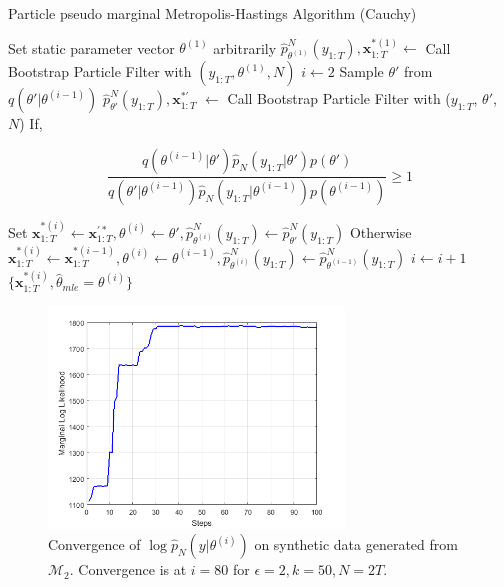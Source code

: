 \documentclass[11pt,a4,twosided,singlespacing,titlepagenumber=on]{scrreprt}
\numberwithin{equation}{chapter} %
\theoremstyle{remark}
\newcommand{\matr}[1]{\mathbf{#1}}
\begin{document}
\begin{algorithm}[H]
\caption{Particle pseudo marginal Metropolis-Hastings Algorithm (Cauchy)}\label{algo_pmcmc_cauchy}
\begin{algorithmic}[1]
\State Set static parameter vector $\theta^{(1)}$ arbitrarily
\State $\hat{p}^N_{\theta^{(1)}}(y_{1:T}), \matr{x}^{*(1)}_{1:T} \gets$ Call Bootstrap Particle Filter with $(y_{1:T}, \theta^{(1)}, N)$
\State $i \gets 2$
	\State Sample $\theta'$ from $q(\theta'|\theta^{(i-1)})$
	\State $\hat{p}^N_{\theta'}(y_{1:T}), \matr{x}^{*'}_{1:T}$ $ \gets$ Call Bootstrap Particle Filter with ($y_{1:T}$, $\theta'$, $N$)
	\State If,
	
	$$\frac{q(\theta^{(i-1)}|\theta')\hat{p}_N(y_{1:T}|\theta')p(\theta')}{q(\theta'|\theta^{(i-1)})\hat{p}_N(y_{1:T}|\theta^{(i-1)})p(\theta^{(i-1)})} \geq 1$$
	
	\State Set $\matr{x}^{*(i)}_{1:T} \gets \matr{x}^{'*}_{1:T},\theta^{(i)} \gets \theta', \hat{p}^N_{\theta^{(i)}}(y_{1:T}) \gets \hat{p}^N_{\theta'}(y_{1:T})$
	\State Otherwise $\matr{x}^{*(i)}_{1:T} \gets \matr{x}^{*(i-1)}_{1:T},\theta^{(i)} \gets \theta^{(i-1)}, \hat{p}^N_{\theta^{(i)}}(y_{1:T}) \gets \hat{p}^N_{\theta^{(i-1)}}(y_{1:T})$
	\State $i \gets i + 1$
\\
\EndProcedure
\Return $\{ \matr{x}^{*(i)}_{1:T}, \hat{\theta}_{mle} = \theta^{(i)} \}$

\end{algorithmic}
\end{algorithm}

\begin{figure}[H]
\centering
\includegraphics[width = 0.7\textwidth]{convergence}
\caption{Convergence of $\log \hat{p}_N(y|\theta^{(i)})$ on synthetic data generated from $\mathcal{M}_2$. Convergence is at $i = 80$ for $\epsilon = 2, k = 50, N = 2T$.}
\label{fig:sr_comparison_2008_2010}
\end{figure}
\end{document}

